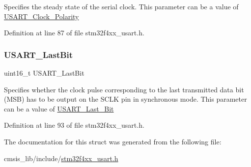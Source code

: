 Specifies the steady state of the serial clock. This parameter can be a value of \hyperlink{group___u_s_a_r_t___clock___polarity}{U\+S\+A\+R\+T\+\_\+\+Clock\+\_\+\+Polarity} 

Definition at line 87 of file stm32f4xx\+\_\+usart.\+h.

\mbox{\label{struct_u_s_a_r_t___clock_init_type_def_a998735e29b6f77d3e993d8d34c74cbca}} 
\subsubsection{\texorpdfstring{U\+S\+A\+R\+T\+\_\+\+Last\+Bit}{USART\_LastBit}}
{\footnotesize\ttfamily uint16\+\_\+t U\+S\+A\+R\+T\+\_\+\+Last\+Bit}

Specifies whether the clock pulse corresponding to the last transmitted data bit (M\+SB) has to be output on the S\+C\+LK pin in synchronous mode. This parameter can be a value of \hyperlink{group___u_s_a_r_t___last___bit}{U\+S\+A\+R\+T\+\_\+\+Last\+\_\+\+Bit} 

Definition at line 93 of file stm32f4xx\+\_\+usart.\+h.



The documentation for this struct was generated from the following file\+:\begin{DoxyCompactItemize}
\item 
cmsis\+\_\+lib/include/\hyperlink{stm32f4xx__usart_8h}{stm32f4xx\+\_\+usart.\+h}\end{DoxyCompactItemize}
